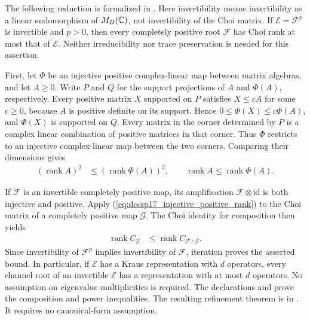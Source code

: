 \documentclass{article}
\begin{document}
The following reduction is formalized in
.
Here invertibility means invertibility as a linear endomorphism of
$M_D(\mathbb{C})$, not invertibility of the Choi matrix. If
$\mathcal E=\mathcal F^p$ is invertible and $p>0$, then every completely
positive root $\mathcal F$ has Choi rank at most that of $\mathcal E$.
Neither irreducibility nor trace preservation is needed for this assertion.

First, let $\Phi$ be an injective positive complex-linear map between
matrix algebras, and let $A\ge0$. Write $P$ and $Q$ for the support
projections of $A$ and $\Phi(A)$, respectively. Every positive matrix $X$
supported on $P$ satisfies $X\le cA$ for some $c\ge0$, because $A$ is
positive definite on its support. Hence
$0\le\Phi(X)\le c\Phi(A)$, and $\Phi(X)$ is supported on $Q$.
Every matrix in the corner determined by $P$ is a complex linear
combination of positive matrices in that corner. Thus $\Phi$ restricts
to an injective complex-linear map between the two corners. Comparing
their dimensions gives
\begin{align}
  (\operatorname{rank} A)^2
  &\le (\operatorname{rank}\Phi(A))^2,
  \qquad
  \operatorname{rank} A\le\operatorname{rank}\Phi(A).
  \label{eq:dccsp17_injective_positive_rank}
\end{align}

If $\mathcal F$ is an invertible completely positive map, its amplification
$\mathcal F\otimes\mathrm{id}$ is both injective and positive. Apply
(\ref{eq:dccsp17_injective_positive_rank}) to the Choi matrix of a
completely positive map $\mathcal G$. The Choi identity for composition
then yields
\begin{align}
  \operatorname{rank} C_{\mathcal G}
  &\le \operatorname{rank} C_{\mathcal F\circ\mathcal G}.
  \label{eq:dccsp17_injective_composition_choi_rank}
\end{align}
Since invertibility of $\mathcal F^p$ implies invertibility of
$\mathcal F$, iteration proves the asserted bound. In particular, if
$\mathcal E$ has a Kraus representation with $d$ operators, every channel
root of an invertible $\mathcal E$ has a representation with at most $d$
operators. No assumption on eigenvalue multiplicities is required.
The declarations
 and
 prove the composition and
power inequalities. The resulting refinement theorem is
 in
.
It requires no canonical-form assumption.
\end{document}
